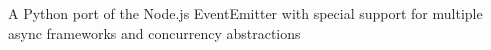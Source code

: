 \begin{project}

  \begin{projectdescription}
    A Python port of the Node.js EventEmitter with special support for multiple
    async frameworks and concurrency abstractions
  \end{projectdescription}
\end{project}
